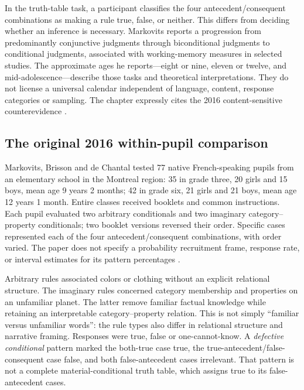 In the truth-table task, a participant classifies the four antecedent/consequent
combinations as making a rule true, false, or neither. This differs from
deciding whether an inference is necessary. Markovits reports a progression
from predominantly conjunctive judgments through biconditional judgments to
conditional judgments, associated with working-memory measures in selected
studies. The approximate ages he reports---eight or nine, eleven or twelve,
and mid-adolescence---describe those tasks and theoretical interpretations.
They do not license a universal calendar independent of language, content,
response categories or sampling. The chapter expressly cites the 2016
content-sensitive counterevidence
\cite[pp.~784--785]{Markovits2021DevelopmentRationality}.

\subsection{The original 2016 within-pupil comparison}
\label{sec:p19-r151-2016-record}

Markovits, Brisson and de Chantal tested 77 native French-speaking pupils
from an elementary school in the Montreal region: 35 in grade three,
20 girls and 15 boys, mean age 9 years 2 months; 42 in grade six,
21 girls and 21 boys, mean age 12 years 1 month. Entire classes received
booklets and common instructions. Each pupil evaluated two arbitrary
conditionals and two imaginary category--property conditionals; two booklet
versions reversed their order. Specific cases represented each of the four
antecedent/consequent combinations, with order varied. The paper does not
specify a probability recruitment frame, response rate, or interval estimates
for its pattern percentages
\cite[pp.~1908--1910]{MarkovitsBrissonDeChantal2016Conditionals}.

Arbitrary rules associated colors or clothing without an explicit relational
structure. The imaginary rules concerned category membership and properties
on an unfamiliar planet. The latter remove familiar factual knowledge while
retaining an interpretable category--property relation. This is not simply
``familiar versus unfamiliar words'': the rule types also differ in relational
structure and narrative framing. Responses were true, false or one-cannot-know.
A \emph{defective conditional} pattern marked the both-true case true, the
true-antecedent/false-consequent case false, and both false-antecedent cases
irrelevant. That pattern is not a complete material-conditional truth table,
which assigns true to its false-antecedent cases.

